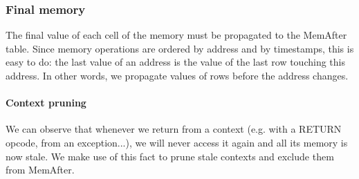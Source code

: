 \subsubsection{Final memory}

The final value of each cell of the memory must be propagated to the MemAfter table. Since memory operations are ordered by address and by timestamps, this is
easy to do: the last value of an address is the value of the last row touching this address. In other words, we propagate values of rows before the address changes.

\paragraph*{Context pruning}
\label{context-pruning}

We can observe that whenever we return from a context (e.g. with a RETURN opcode, from an exception...), we will never access it again and all its memory is now stale.
We make use of this fact to prune stale contexts and exclude them from MemAfter.


